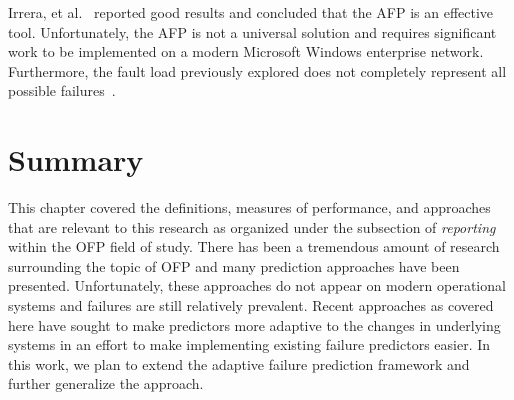 Irrera, et al.~\cite{irrera2015} reported good results and concluded that the
AFP is an effective tool.  Unfortunately, the AFP is not a universal solution
and requires significant work to be implemented on a modern Microsoft Windows
enterprise network.  Furthermore, the fault load previously explored does not
completely represent all possible failures~\cite{kikuchi2014}.

\section{Summary} \label{summary}
This chapter covered the definitions, measures of performance, and approaches
that are relevant to this research as organized under the subsection of
\emph{reporting} within the OFP field of study.  There has been a tremendous
amount of research surrounding the topic of OFP and many prediction approaches
have been presented.  Unfortunately, these approaches do not appear on modern
operational systems and failures are still relatively prevalent.  Recent
approaches as covered here have sought to make predictors more adaptive to the
changes in underlying systems in an effort to make implementing existing
failure predictors easier.  In this work, we plan to extend the adaptive
failure prediction framework and further generalize the approach.  
